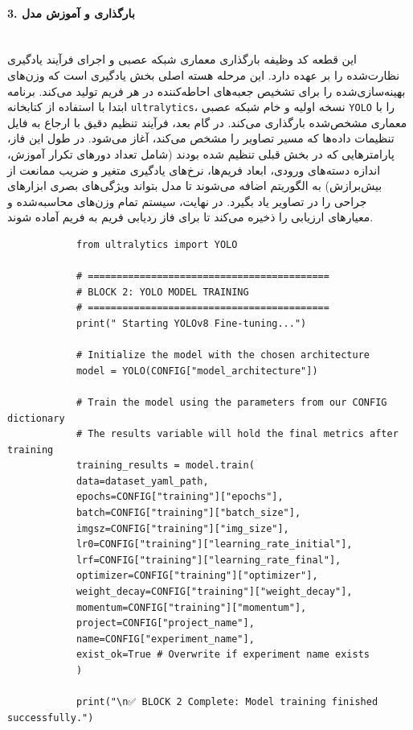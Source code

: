 \documentclass{article}
\begin{document}
\paragraph{3. بارگذاری و آموزش مدل} \mbox{}\\
این قطعه کد وظیفه بارگذاری معماری شبکه عصبی و اجرای فرآیند یادگیری نظارت‌شده را بر عهده دارد. این مرحله هسته اصلی بخش یادگیری است که وزن‌های بهینه‌سازی‌شده را برای تشخیص جعبه‌های احاطه‌کننده در هر فریم تولید می‌کند. برنامه ابتدا با استفاده از کتابخانه \texttt{ultralytics}، نسخه اولیه و خام شبکه عصبی \texttt{YOLO} را با معماری مشخص‌شده بارگذاری می‌کند. در گام بعد، فرآیند تنظیم دقیق با ارجاع به فایل تنظیمات داده‌ها که مسیر تصاویر را مشخص می‌کند، آغاز می‌شود. در طول این فاز، پارامترهایی که در بخش قبلی تنظیم شده بودند (شامل تعداد دورهای تکرار آموزش، اندازه دسته‌های ورودی، ابعاد فریم‌ها، نرخ‌های یادگیری متغیر و ضریب ممانعت از بیش‌برازش) به الگوریتم اضافه می‌شوند تا مدل بتواند ویژگی‌های بصری ابزارهای جراحی را در تصاویر یاد بگیرد. در نهایت، سیستم تمام وزن‌های محاسبه‌شده و معیارهای ارزیابی را ذخیره می‌کند تا برای فاز ردیابی فریم به فریم آماده شوند.
\begin{latin}
	\begin{LTR}
		\begin{verbatim}
			from ultralytics import YOLO
			
			# ==========================================
			# BLOCK 2: YOLO MODEL TRAINING
			# ==========================================
			print(" Starting YOLOv8 Fine-tuning...")
			
			# Initialize the model with the chosen architecture
			model = YOLO(CONFIG["model_architecture"])
			
			# Train the model using the parameters from our CONFIG dictionary
			# The results variable will hold the final metrics after training
			training_results = model.train(
			data=dataset_yaml_path,
			epochs=CONFIG["training"]["epochs"],
			batch=CONFIG["training"]["batch_size"],
			imgsz=CONFIG["training"]["img_size"],
			lr0=CONFIG["training"]["learning_rate_initial"],
			lrf=CONFIG["training"]["learning_rate_final"],
			optimizer=CONFIG["training"]["optimizer"],
			weight_decay=CONFIG["training"]["weight_decay"],
			momentum=CONFIG["training"]["momentum"],
			project=CONFIG["project_name"],
			name=CONFIG["experiment_name"],
			exist_ok=True # Overwrite if experiment name exists
			)
			
			print("\n✅ BLOCK 2 Complete: Model training finished successfully.")
		\end{verbatim}
	\end{LTR}
\end{latin}
\end{document}
